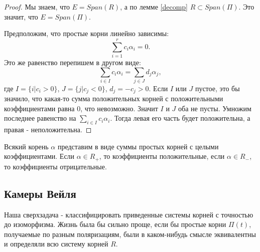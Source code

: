\documentclass[a4article]{article}
\begin{document}
\begin{proof}
    Мы знаем, что $E = Span(R)$, а по лемме \ref{decomp} $R \subset Span(\Pi)$. Это значит, что $E = Span(\Pi)$.
    
    Предположим, что простые корни линейно зависимы:
    $$\sum_{i=1}^{r}c_i \alpha_i=0.$$ Это же равенство перепишем в другом виде:
    $$\sum_{i \in I}c_i \alpha_i = \sum_{j \in J}d_j \alpha_j,$$
    где $I = \{i|c_i > 0\}$, $J = \{j|c_j < 0\}$, $d_j = -c_j > 0$. Если $I$ или $J$ пустое, это бы значило, что какая-то сумма положительных корней с положительными коэффициентами равна 0, что невозможно. Значит $I$ и $J$ оба не пусты.
    Умножим последнее равенство на $\sum_{i \in I}c_i \alpha_i$. Тогда левая его часть будет положительна, а правая - неположительна.
\end{proof}
\begin{corollary}
    Всякий корень $\alpha$ представим в виде суммы простых корней с целыми коэффициентами. Если $\alpha \in R_{+}$, то коэффициенты положительные, если $\alpha \in R_{-}$, то коэффициенты отрицательные.
\end{corollary}
\subsection*{Камеры Вейля}

Наша сверхзадача - классифицировать приведенные системы корней с точностью до изоморфизма. Жизнь была бы сильно проще, если бы простые корни $\Pi(t)$, получаемые по разным поляризациям, были в каком-нибудь смысле эквивалентны и определяли всю систему корней $R$.
\end{document}
